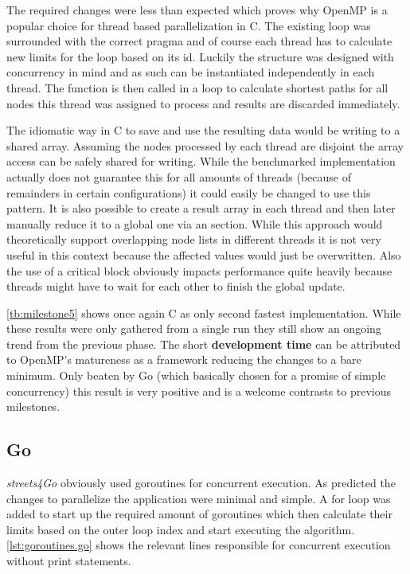 The required changes were less than expected which proves why OpenMP is a popular choice for thread based parallelization in C. The existing loop was surrounded with the correct pragma and of course each thread has to calculate new limits for the loop based on its id. Luckily the  structure was designed with concurrency in mind and as such can be instantiated independently in each thread. The  function is then called in a loop to calculate shortest paths for all nodes this thread was assigned to process and results are discarded immediately.

The idiomatic way in C to save and use the resulting data would be writing to a shared array. Assuming the nodes processed by each thread are disjoint the array access can be safely shared for writing. While the benchmarked implementation actually does not guarantee this for all amounts of threads (because of remainders in certain configurations) it could easily be changed to use this pattern. It is also possible to create a result array in each thread and then later manually reduce it to a global one via an  section. While this approach would theoretically support overlapping node lists in different threads it is not very useful in this context because the affected values would just be overwritten. Also the use of a critical block obviously impacts performance quite heavily because threads might have to wait for each other to finish the global update.

\autoref{tb:milestone5} shows once again C as only second fastest implementation. While these results were only gathered from a single run they still show an ongoing trend from the previous phase. The short \textbf{development time} can be attributed to OpenMP's matureness as a framework reducing the changes to a bare minimum. Only beaten by Go (which basically chosen for a promise of simple concurrency) this result is very positive and is a welcome contrasts to previous milestones.

\subsection{Go}
\label{subsec:Implementation::ParallelBenchmark::Go}

\textit{streets4Go} obviously used \glspl{goroutine} for concurrent execution. As predicted the changes to parallelize the application were minimal and simple. A for loop was added to start up the required amount of \glspl{goroutine} which then calculate their limits based on the outer loop index and start executing the algorithm. \autoref{lst:goroutines.go} shows the relevant lines responsible for concurrent execution without print statements.
\\


